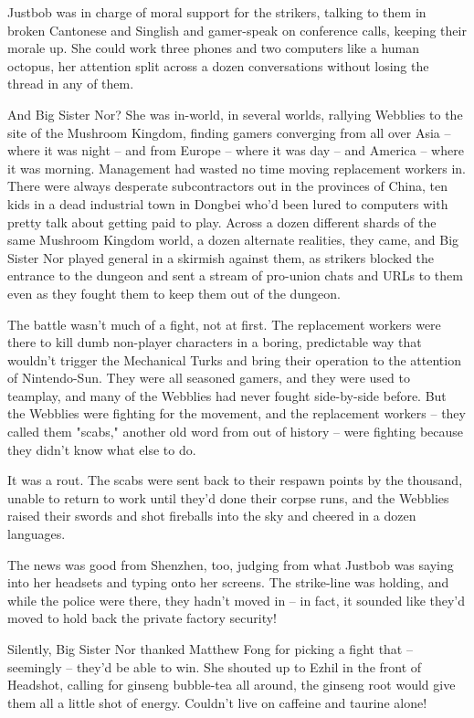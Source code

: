 Justbob was in charge of moral support for the strikers, talking to
them in broken Cantonese and Singlish and gamer-speak on conference
calls, keeping their morale up. She could work three phones and two
computers like a human octopus, her attention split across a dozen
conversations without losing the thread in any of them.

And Big Sister Nor? She was in-world, in several worlds, rallying
Webblies to the site of the Mushroom Kingdom, finding gamers
converging from all over Asia -- where it was night -- and from
Europe -- where it was day -- and America -- where it was morning.
Management had wasted no time moving replacement workers in. There
were always desperate subcontractors out in the provinces of China,
ten kids in a dead industrial town in Dongbei who'd been lured to
computers with pretty talk about getting paid to play. Across a
dozen different shards of the same Mushroom Kingdom world, a dozen
alternate realities, they came, and Big Sister Nor played general
in a skirmish against them, as strikers blocked the entrance to the
dungeon and sent a stream of pro-union chats and URLs to them even
as they fought them to keep them out of the dungeon.

The battle wasn't much of a fight, not at first. The replacement
workers were there to kill dumb non-player characters in a boring,
predictable way that wouldn't trigger the Mechanical Turks and
bring their operation to the attention of Nintendo-Sun. They were
all seasoned gamers, and they were used to teamplay, and many of
the Webblies had never fought side-by-side before. But the Webblies
were fighting for the movement, and the replacement workers -- they
called them "scabs," another old word from out of history -- were
fighting because they didn't know what else to do.

It was a rout. The scabs were sent back to their respawn points by
the thousand, unable to return to work until they'd done their
corpse runs, and the Webblies raised their swords and shot
fireballs into the sky and cheered in a dozen languages.

The news was good from Shenzhen, too, judging from what Justbob was
saying into her headsets and typing onto her screens. The
strike-line was holding, and while the police were there, they
hadn't moved in -- in fact, it sounded like they'd moved to hold
back the private factory security!

Silently, Big Sister Nor thanked Matthew Fong for picking a fight
that -- seemingly -- they'd be able to win. She shouted up to Ezhil
in the front of Headshot, calling for ginseng bubble-tea all
around, the ginseng root would give them all a little shot of
energy. Couldn't live on caffeine and taurine alone!

